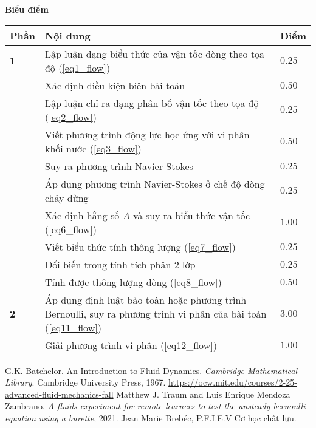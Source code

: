 \textbf{Biểu điểm}
\begin{center}
\begin{tabular}{|>{\centering\arraybackslash}m{1cm}|>{\raggedright\arraybackslash}m{14cm}| >{\centering\arraybackslash}m{1cm}|}
    \hline
    \textbf{Phần} & \textbf{Nội dung} & \textbf{Điểm} \\
    \hline
    \textbf{1} & Lập luận dạng biểu thức của vận tốc dòng theo tọa độ (\ref{eq1_flow}) & $0.25$ \\
    \cline{2-3}
    & Xác định điều kiện biên bài toán & $0.50$ \\
    \cline{2-3}
    & Lập luận chỉ ra dạng phân bố vận tốc theo tọa độ (\ref{eq2_flow}) & $0.25$ \\
    \cline{2-3}
    & Viết phương trình động lực học ứng với vi phân khối nước (\ref{eq3_flow}) & $0.50$ \\
    \cline{2-3}
    & Suy ra phương trình Navier-Stokes & $0.25$ \\
    \cline{2-3}
    & Áp dụng phương trình Navier-Stokes ở chế độ dòng chảy dừng & $0.25$ \\
    \cline{2-3}
    & Xác định hằng số $A$ và suy ra biểu thức vận tốc (\ref{eq6_flow}) & $1.00$ \\
    \cline{2-3}
    & Viết biểu thức tính thông lượng  (\ref{eq7_flow}) & $0.25$ \\
    \cline{2-3}
    & Đổi biến trong tính tích phân 2 lớp & $0.25$ \\
    \cline{2-3}
    & Tính được thông lượng dòng (\ref{eq8_flow}) & $0.50$ \\
    \hline
    \textbf{2} & Áp dụng định luật bảo toàn hoặc phương trình Bernoulli, suy ra phương trình vi phân của bài toán (\ref{eq11_flow}) & $3.00$ \\
    \cline{2-3}
    & Giải phương trình vi phân (\ref{eq12_flow}) & $1.00$ \\
    \hline
\end{tabular}
\end{center}


\begin{thebibliography}{}
 G.K. Batchelor. An Introduction to Fluid Dynamics. \textit{Cambridge Mathematical Library}. Cambridge University Press, 1967.
 \href{https://ocw.mit.edu/courses/2-25-advanced-fluid-mechanics-fall-2013/1ff7ec3782567cdcedabdfd4b95c1792_MIT2_25F13_Unstea_Bernou.pdf}{https://ocw.mit.edu/courses/2-25-advanced-fluid-mechanics-fall}
 Matthew J. Traum and Luis Enrique Mendoza Zambrano. \textit{A fluids experiment for remote learners to test the unsteady bernoulli equation using a burette}, 2021.
 Jean Marie Brebéc, P.F.I.E.V Cơ học chất lưu.
\end{thebibliography}